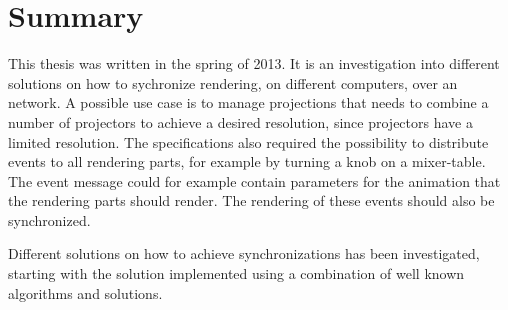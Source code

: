 \chapter{Summary}

This thesis was written in the spring of 2013. It is an investigation into different solutions on how to sychronize rendering, on different computers, over an network. A possible use case is to manage projections that needs to combine a number of projectors to achieve a desired resolution, since projectors have a limited resolution. The specifications also required the possibility to distribute events to all rendering parts, for example by turning a knob on a mixer-table. The event message could for example contain parameters for the animation that the rendering parts should render. The rendering of these events should also be synchronized. 

Different solutions on how to achieve synchronizations has been investigated, starting with the solution implemented using a combination of well known algorithms and solutions. 
